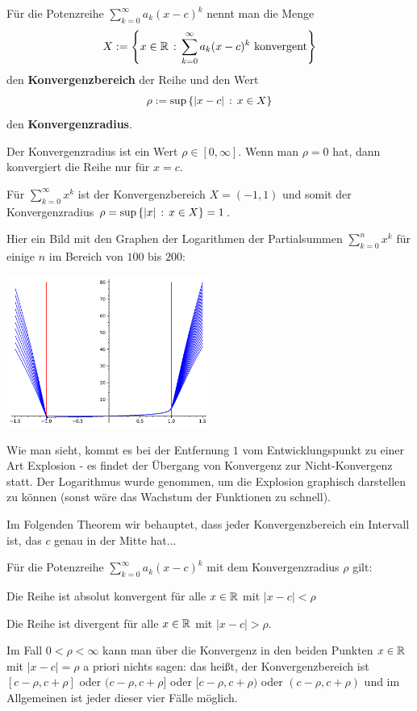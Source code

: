 \begin{defn}
	Für die Potenzreihe $\sum_{k=0}^\infty a_k (x-c)^k$ nennt man die Menge 
	\[
		 X:= \left\{ x \in \mathbb{R} \,:\, \sum_{k=0}^\infty a_k (x-c)^k \ \text{konvergent} \right\} 
	\]
	den \textbf{Konvergenzbereich} der Reihe und den Wert 
	\[
		\rho := \sup \left\{ |x-c| \,:\, x \in X \right\}
	\]
	den \textbf{Konvergenzradius}. 
\end{defn} 


\begin{bem}
	Der Konvergenzradius ist ein Wert $\rho \in [0,\infty]$. Wenn man $\rho=0$ hat, dann konvergiert die Reihe nur für $x=c$. 
\end{bem} 

\begin{bsp}
	Für $\sum_{k=0}^\infty x^k$ ist der Konvergenzbereich $X = (-1,1)$ und somit der Konvergenzradius $\rho = \sup \left\{ |x| \,:\, x \in X \right\} = 1$.  

	Hier ein Bild mit den Graphen der Logarithmen der Partialsummen $\sum_{k=0}^n x^k$ für einige $n$ im Bereich von $100$ bis $200$: 
 \begin{center} 	
			\includegraphics[width=0.5\textwidth]{pics/konvergenzradius_potenzreihe.pdf}
	\end{center} 
	Wie man sieht, kommt es bei der Entfernung $1$ vom Entwicklungspunkt zu einer Art Explosion  - es findet der Übergang von Konvergenz zur Nicht-Konvergenz statt. Der Logarithmus  wurde  genommen, um die Explosion graphisch darstellen zu können (sonst wäre das Wachstum der Funktionen zu schnell). 
	
	Im Folgenden Theorem wir behauptet, dass jeder Konvergenzbereich ein Intervall ist, das $c$ genau in der Mitte hat...
\end{bsp} 

\begin{thm}
	Für die Potenzreihe $\sum_{k=0}^\infty a_k (x-c)^k$ mit dem Konvergenzradius $\rho$ gilt: 
	\begin{enuma}
		\item Die Reihe ist absolut konvergent für alle $x \in \mathbb{R}$ mit $|x-c| < \rho$
		\item Die Reihe ist divergent für alle $x \in \mathbb{R}$ mit $|x-c| > \rho$.
		\item Im Fall $0 < \rho < \infty$ kann man über die Konvergenz in den beiden Punkten $x \in \mathbb{R}$ mit $|x-c| = \rho$ a priori nichts sagen: das heißt, der Konvergenzbereich ist $[c-\rho,c+\rho]$ oder $(c-\rho,c+\rho]$ oder $[c-\rho,c+\rho)$ oder $(c-\rho,c+\rho)$ und im Allgemeinen ist jeder dieser vier Fälle möglich. 
	\end{enuma}
\end{thm} 

